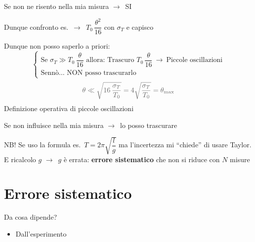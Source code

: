 \documentclass[11pt,a4paper,oneside]{book}
\newcommand{\grigio}[1]{{\color{grigio}#1}}
\newcommand{\fr}{\ensuremath{\rightarrow}}
\newcommand{\chiave}[1]{\textbf{#1}}
\begin{document}
Se non ne risento nella mia misura \fr\ SI

Dunque confronto es.\ \fr\ $T_0\, \dfrac{\theta^2}{16}$ con $\sigma_T$ e capisco

Dunque non posso saperlo a priori:
\[
  \begin{cases}
    \text{Se } \sigma_T \gg T_0\, \dfrac{\theta}{16} \text{ allora: Trascuro } T_0\, \dfrac{\theta}{16} \ \to\ \text{Piccole oscillazioni} \\[8pt]
    \text{Sennò\ldots\ NON posso trascurarlo}
  \end{cases}
\]
\[
  \text{\grigio{$\theta \ll \sqrt{16\, \dfrac{\sigma_T}{T_0}} = 4 \sqrt{\dfrac{\sigma_T}{T_0}} = \theta_{\max}$}}
\]
Definizione operativa di piccole oscillazioni

\begin{attenzione}[NB!]
Se non influisce nella mia misura \fr\ lo posso trascurare
\end{attenzione}

\begin{spunto}
NB! Se uso la formula es.\ $T = 2\pi \sqrt{\dfrac{l}{g}}$ ma l'incertezza mi ``chiede'' di usare Taylor. E ricalcolo $g$ \fr\ $g$ è errata: \chiave{errore sistematico} che non si riduce con $N$ misure
\end{spunto}

\newpage
\section{Errore sistematico}

Da cosa dipende?
\begin{itemize}[label=--]
  \item Dall'esperimento
\end{itemize}
\end{document}
